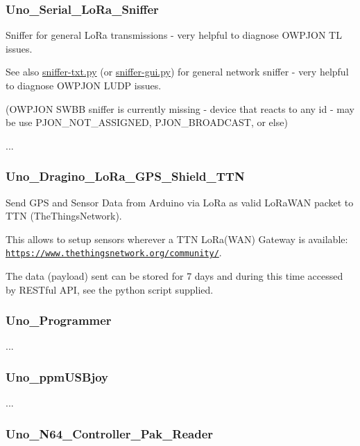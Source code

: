 \subsubsection*{Uno\-\_\-\-Serial\-\_\-\-Lo\-Ra\-\_\-\-Sniffer}

Sniffer for general Lo\-Ra transmissions -\/ very helpful to diagnose O\-W\-P\-J\-O\-N T\-L issues.

See also \hyperlink{sniffer-txt_8py}{sniffer-\/txt.\-py} (or \hyperlink{sniffer-gui_8py}{sniffer-\/gui.\-py}) for general network sniffer -\/ very helpful to diagnose O\-W\-P\-J\-O\-N L\-U\-D\-P issues.

(O\-W\-P\-J\-O\-N S\-W\-B\-B sniffer is currently missing -\/ device that reacts to any id -\/ may be use P\-J\-O\-N\-\_\-\-N\-O\-T\-\_\-\-A\-S\-S\-I\-G\-N\-E\-D, P\-J\-O\-N\-\_\-\-B\-R\-O\-A\-D\-C\-A\-S\-T, or else)

...

\subsubsection*{Uno\-\_\-\-Dragino\-\_\-\-Lo\-Ra\-\_\-\-G\-P\-S\-\_\-\-Shield\-\_\-\-T\-T\-N}

Send G\-P\-S and Sensor Data from Arduino via Lo\-Ra as valid Lo\-Ra\-W\-A\-N packet to T\-T\-N (The\-Things\-Network).

This allows to setup sensors wherever a T\-T\-N Lo\-Ra(\-W\-A\-N) Gateway is available\-: \href{https://www.thethingsnetwork.org/community/}{\tt https\-://www.\-thethingsnetwork.\-org/community/}.

The data (payload) sent can be stored for 7 days and during this time accessed by R\-E\-S\-Tful A\-P\-I, see the python script supplied.

\subsubsection*{Uno\-\_\-\-Programmer}

...

\subsubsection*{Uno\-\_\-ppm\-U\-S\-Bjoy}

...

\subsubsection*{Uno\-\_\-\-N64\-\_\-\-Controller\-\_\-\-Pak\-\_\-\-Reader}

